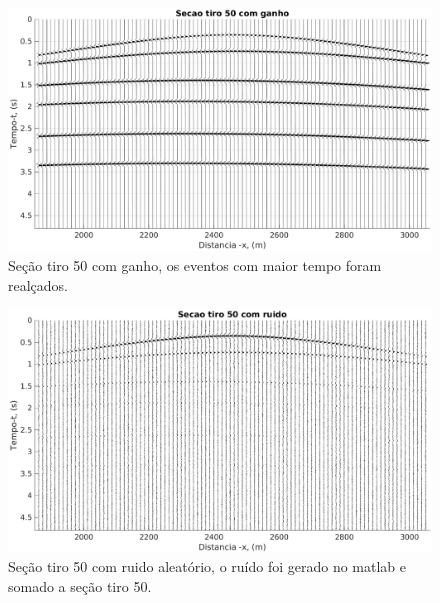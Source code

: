 \begin{landscape}
\begin{figure}[H]
\centering
\includegraphics[totalheight=14cm]{figuras/cap3/secao_tiro50_ganho.eps}
\caption{Seção tiro 50 com ganho, os eventos com maior tempo foram realçados.}
\label{fig:tiro_50gain}
\end{figure}
\end{landscape}

\begin{landscape}
\begin{figure}[H]
\centering
\includegraphics[totalheight=14cm]{figuras/cap3/secao_tiro50_ruido.eps}
\caption{Seção tiro 50 com ruido aleatório, o ruído foi gerado no matlab e somado a seção tiro 50.}
\label{fig:tiro_50ruido}
\end{figure}
\end{landscape}

